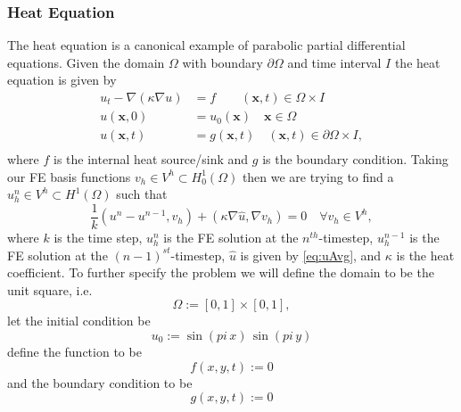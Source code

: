 \subsubsection{Heat Equation} \label{sss:Heat}
    The heat equation is a canonical example of parabolic partial differential
    equations. Given the domain $\Omega$ with boundary $\partial \Omega$ and
    time interval $I$ the heat equation is given by
    \begin{equation}
        \begin{split}
            u_t - \nabla \left( \kappa \nabla u \right) &= f
                \qquad (\mathbf{x}, t)\in \Omega \times I \\
            u(\mathbf{x}, 0) &= u_0(\mathbf{x}) \quad \mathbf{x} \in \Omega \\
            u(\mathbf{x}, t) &= g(\mathbf{x},t) \quad (\mathbf{x}, t)\in
                \partial\Omega \times I, \\
        \end{split}
        \label{eq:Heat}
    \end{equation}
    where $f$ is the internal heat source/sink and $g$ is the boundary
    condition. Taking our FE basis functions $v_h\in V^h\subset H^1_0(\Omega)$
    then we are trying to find a $u^n_h \in V^h \subset H^1(\Omega)$ such that
    \begin{equation}
        \frac{1}{k} (u^n - u^{n-1}, v_h) + (\kappa \nabla \hat{u}, \nabla v_h) =
        0 \quad \forall v_h \in V^h,
        \label{eq:WeakHeat}
    \end{equation}
    where $k$ is the time step, $u^n_h$ is the FE solution at the
    $n^{th}$-timestep, $u^{n-1}_h$ is the FE solution at the
    $(n-1)^{st}$-timestep, $\hat{u}$ is given by \eqref{eq:uAvg}, and $\kappa$
    is the heat coefficient. To further
    specify the problem we will define the domain to be the unit square, i.e.
    \begin{equation}
        \Omega := [0, 1] \times [0, 1],
        \label{eq:HeatDomain}
    \end{equation}
    let the initial condition be
    \begin{equation}
        u_0 := \sin(pi\, x)\, \sin(pi\, y)
        \label{eq:HeatIC}
    \end{equation}
    define the function to be
    \begin{equation}
        f(x,y,t) := 0
        \label{eq:HeatSource}
    \end{equation}
    and the boundary condition to be
    \begin{equation}
        g(x,y,t) := 0
        \label{eq:HeatBC}
    \end{equation}


